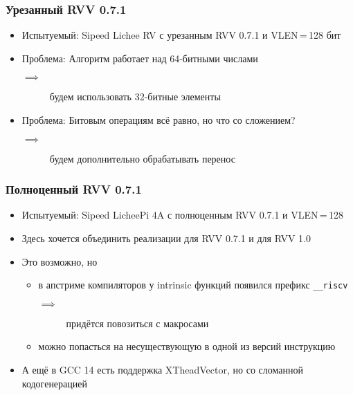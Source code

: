 \documentclass[
    aspectratio=169,
]{beamer}
\begin{document}
\begin{frame}
    \frametitle{Урезанный RVV 0.7.1}

    \begin{itemize}
        \item Испытуемый: Sipeed Lichee RV с урезанным RVV 0.7.1 и VLEN\,=\,128 бит
        \item \textcolor{solarizedRed}{Проблема}: Алгоритм работает над 64-битными числами
              \begin{description}
                  \item[\textcolor{solarizedGreen}{$\implies$}] будем использовать 32-битные элементы
              \end{description}
        \item \textcolor{solarizedRed}{Проблема}: Битовым операциям всё равно, но что со сложением?
              \begin{description}
                  \item[\textcolor{solarizedGreen}{$\implies$}] будем дополнительно обрабатывать перенос
              \end{description}
    \end{itemize}
\end{frame}

\begin{frame}
    \frametitle{Полноценный RVV 0.7.1}

    \begin{itemize}
        \item Испытуемый: Sipeed LicheePi 4A с полноценным RVV 0.7.1 и VLEN\,=\,128 %
        \item Здесь хочется объединить реализации для RVV 0.7.1 и для RVV 1.0
        \item Это возможно, \textcolor{solarizedRed}{но}
              \begin{itemize}
                  \item в апстриме компиляторов у intrinsic функций появился префикс \texttt{\_\_riscv}
                        \begin{description}
                            \item[$\implies$] придётся повозиться с макросами
                        \end{description}
                  \item можно попасться на несуществующую в одной из версий инструкцию
              \end{itemize}
        \item А ещё в GCC 14 есть поддержка XTheadVector, но со сломанной кодогенерацией 
    \end{itemize}

\end{frame}
\end{document}

